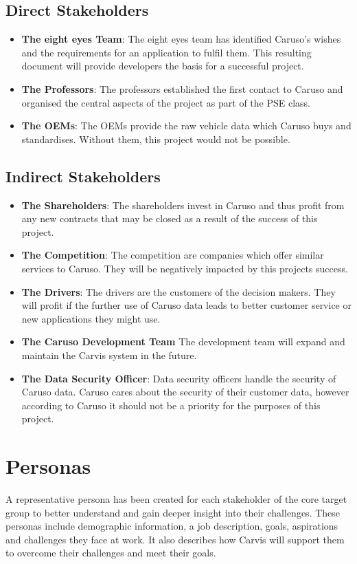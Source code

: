 \subsection{Direct Stakeholders}
\begin{itemize}
  \item \textbf{The eight eyes Team}: The eight eyes team has identified Caruso's wishes and the requirements for an application to fulfil them. This resulting document will provide developers the basis for a successful project.
  \item \textbf{The Professors}: The professors established the first contact to Caruso and organised the central aspects of the project as part of the PSE class.
  \item \textbf{The OEMs}: The OEMs provide the raw vehicle data which Caruso buys and standardises. Without them, this project would not be possible.
\end{itemize}

\subsection{Indirect Stakeholders}
\begin{itemize}
  \item \textbf{The Shareholders}: The shareholders invest in Caruso and thus profit from any new contracts that may be closed as a result of the success of this project.
  \item \textbf{The Competition}: The competition are companies which offer similar services to Caruso. They will be negatively impacted by this projects success.
  \item \textbf{The Drivers}: The drivers are the customers of the decision makers. They will profit if the further use of Caruso data leads to better customer service or new applications they might use.
  \item \textbf{The Caruso Development Team} The development team will expand and maintain the Carvis system in the future.
  \item \textbf{The Data Security Officer}: Data security officers handle the security of Caruso data. Caruso cares about the security of their customer data, however according to Caruso it should not be a priority for the purposes of this project.
\end{itemize}

\section{Personas}
A representative persona has been created for each stakeholder of the core target group to better understand and gain deeper insight into their challenges. These personas include demographic information, a job description, goals, aspirations and challenges they face at work. It also describes how Carvis will support them to overcome their challenges and meet their goals.

